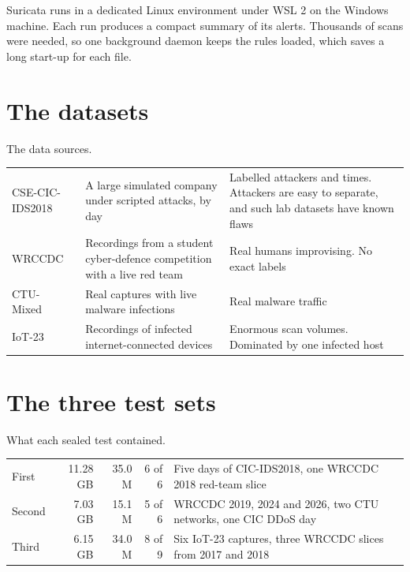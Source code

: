 Suricata runs in a dedicated Linux environment under WSL 2 on the Windows machine. Each run produces a compact summary of its alerts. Thousands of scans were needed, so one background daemon keeps the rules loaded, which saves a long start-up for each file.

\section{The datasets}
\begin{gtable}{The data sources.}
\begin{tabularx}{\linewidth}{l L L}
\toprule
{} &  & \\
\midrule
CSE-CIC-IDS2018~\cite{cic} & A large simulated company under scripted attacks, by day & Labelled attackers and times. Attackers are easy to separate, and such lab datasets have known flaws~\cite{troubleshooting}\\
WRCCDC & Recordings from a student cyber-defence competition with a live red team & Real humans improvising. No exact labels\\
CTU-Mixed~\cite{ctu} & Real captures with live malware infections & Real malware traffic\\
IoT-23~\cite{iot23} & Recordings of infected internet-connected devices & Enormous scan volumes. Dominated by one infected host\\
\bottomrule
\end{tabularx}
\end{gtable}

\section{The three test sets}
\begin{gtable}{What each sealed test contained.}
\begin{tabularx}{\linewidth}{l r r r L}
\toprule
{} &  &  &  & \\
\midrule
First & 11.28 GB & 35.0 M & 6 of 6 & Five days of CIC-IDS2018, one WRCCDC 2018 red-team slice\\
Second & 7.03 GB & 15.1 M & 5 of 6 & WRCCDC 2019, 2024 and 2026, two CTU networks, one CIC DDoS day\\
Third & 6.15 GB & 34.0 M & 8 of 9 & Six IoT-23 captures, three WRCCDC slices from 2017 and 2018\\
\bottomrule
\end{tabularx}
\end{gtable}

